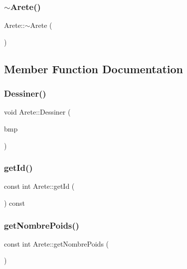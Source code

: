 \mbox{\label{class_arete_a3abde319ff71a269b69e93f365262205}} 
\subsubsection{\texorpdfstring{$\sim$Arete()}{~Arete()}}
{\footnotesize\ttfamily Arete\+::$\sim$\+Arete (\begin{DoxyParamCaption}{ }\end{DoxyParamCaption})}



\subsection{Member Function Documentation}
\mbox{\label{class_arete_af933957080e789335218ee0e5da5eed4}} 
\subsubsection{\texorpdfstring{Dessiner()}{Dessiner()}}
{\footnotesize\ttfamily void Arete\+::\+Dessiner (\begin{DoxyParamCaption}\item[{A\+L\+L\+E\+G\+R\+O\+\_\+\+B\+I\+T\+M\+AP $\ast$}]{bmp }\end{DoxyParamCaption})}

\mbox{\label{class_arete_aeda0a1c10d9a9a52196e3c641f363646}} 
\subsubsection{\texorpdfstring{getId()}{getId()}}
{\footnotesize\ttfamily const int Arete\+::get\+Id (\begin{DoxyParamCaption}{ }\end{DoxyParamCaption}) const}

\mbox{\label{class_arete_a78c1e560a06e83ee7eb1adfb690e63b2}} 
\subsubsection{\texorpdfstring{getNombrePoids()}{getNombrePoids()}}
{\footnotesize\ttfamily const int Arete\+::get\+Nombre\+Poids (\begin{DoxyParamCaption}{ }\end{DoxyParamCaption})}

